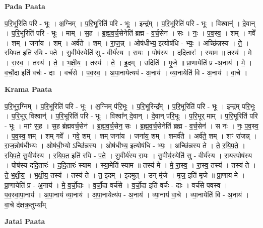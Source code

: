\documentclass[17pt]{extarticle}
\begin{document}
\textbf{Pada Paata} \newline

प॒रि॒भूरिति॑ परि - भूः । अ॒ग्निम् । प॒रि॒भूरिति॑ परि - भूः । इन्द्र᳚म् । प॒रि॒भूरिति॑ परि - भूः । विश्वान्॑ । दे॒वान् । प॒रि॒भूरिति॑ परि - भूः । माम् । स॒ह । ब्र॒ह्म॒व॒र्च॒सेनेति॑ ब्रह्म - व॒र्च॒सेन॑ । सः । नः॒ । प॒व॒स्व॒ । शम् । गवे᳚ । शम् । जना॑य । शम् । अर्व॑ते । शम् । रा॒ज॒न्न् । ओष॑धीभ्य॒ इत्योष॑धि - भ्यः॒ । अच्छि॑न्नस्य । ते॒ । र॒यि॒प॒त॒ इति॑ रयि - प॒ते॒ । सु॒वीर्य॒स्येति॑ सु - वीर्य॑स्य । रा॒यः । पोष॑स्य । द॒दि॒तारः॑ । स्या॒म॒ ॥ तस्य॑ । मे॒ । रा॒स्व॒ । तस्य॑ । ते॒ । भ॒क्षी॒य॒ । तस्य॑ । ते॒ । इ॒दम् । उदिति॑ । मृ॒जे॒ ॥ प्रा॒णायेति॑ प्र -अ॒नाय॑ । मे॒ । व॒र्चो॒दा इति॑ वर्चः - दाः । वर्च॑से । प॒व॒स्व॒ । अ॒पा॒नायेत्यप॑ - अ॒नाय॑ । व्या॒नायेति॑ वि - अ॒नाय॑ । वा॒चे ।  \newline


\textbf{Krama Paata} \newline

प॒रि॒भूर॒ग्निम् । प॒रि॒भूरिति॑ परि - भूः । अ॒ग्निम् प॑रि॒भूः । प॒रि॒भूरिन्द्र᳚म् । प॒रि॒भूरिति॑ परि - भूः । इन्द्र॑म् परि॒भूः । प॒रि॒भूर् विश्वान्॑ । प॒रि॒भूरिति॑ परि - भूः । विश्वा᳚न् दे॒वान् । दे॒वान् प॑रि॒भूः । 
प॒रि॒भूर् माम् । प॒रि॒भूरिति॑ परि - भूः । माꣳ स॒ह । स॒ह ब्र॑ह्मवर्च॒सेन॑ । ब्र॒ह्म॒व॒र्च॒सेन॒ सः । ब्र॒ह्म॒व॒र्च॒सेनेति॑ ब्रह्म - व॒र्च॒सेन॑ । स नः॑ । नः॒ प॒व॒स्व॒ । प॒व॒स्व॒ शम् । शम् गवे᳚ । गवे॒ शम् । शम् जना॑य । जना॑य॒ शम् । शमर्व॑ते । अर्व॑ते॒ शम् । शꣳ रा॑जन्न् । रा॒ज॒न्नोष॑धीभ्यः । ओष॑धी॒भ्यो ऽच्छि॑न्नस्य । ओष॑धीभ्य॒ इत्योष॑धि - भ्यः॒ । अच्छि॑न्नस्य ते । ते॒ र॒यि॒प॒ते॒ । र॒यि॒प॒ते॒ सु॒वीर्य॑स्य । र॒यि॒प॒त॒ इति॑ रयि - प॒ते॒ । सु॒वीर्य॑स्य रा॒यः । सु॒वीर्य॒स्येति॑ सु - वीर्य॑स्य । रा॒यस्पोष॑स्य । पोष॑स्य ददि॒तारः॑ । द॒दि॒तारः॑ स्याम । स्या॒मेति॑ स्याम ॥ तस्य॑ मे । मे॒ रा॒स्व॒ । रा॒स्व॒ तस्य॑ । तस्य॑ ते । ते॒ भ॒क्षी॒य॒ । भ॒क्षी॒य॒ तस्य॑ । तस्य॑ ते । त॒ इ॒दम् । इ॒दमुत् । उन् मृ॑जे । मृ॒ज॒ इति॑ मृजे ॥ प्रा॒णाय॑ मे । प्रा॒णायेति॑ प्र - अ॒नाय॑ । मे॒ व॒र्चो॒दाः । व॒र्चो॒दा वर्च॑से । व॒र्चो॒दा इति॑ वर्चः - दाः । वर्च॑से पवस्व । प॒व॒स्वा॒पा॒नाय॑ । अ॒पा॒नाय॑ व्या॒नाय॑ । अ॒पा॒नायेत्य॑प - अ॒नाय॑ । व्या॒नाय॑ वा॒चे । व्या॒नायेति॑ वि - अ॒नाय॑ । वा॒चे द॑क्षक्र॒तुभ्या᳚म् \newline

\textbf{Jatai Paata} \newline
\end{document}
